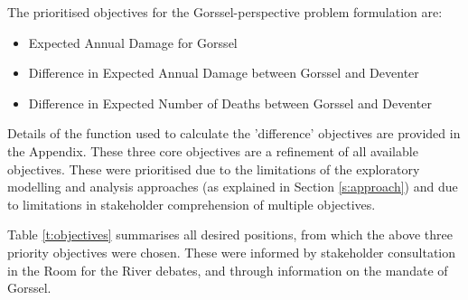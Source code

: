The prioritised objectives for the Gorssel-perspective problem formulation are:
\begin{itemize}
    \item Expected Annual Damage for Gorssel
    \item Difference in Expected Annual Damage between Gorssel and Deventer
    \item Difference in Expected Number of Deaths between Gorssel and Deventer
\end{itemize}
Details of the function used to calculate the 'difference' objectives are provided in the Appendix. These three core objectives are a refinement of all available objectives. These were prioritised due to the limitations of the exploratory modelling and analysis approaches (as explained in Section \ref{s:approach}) and due to limitations in stakeholder comprehension of multiple objectives.

Table \ref{t:objectives} summarises all desired positions, from which the above three priority objectives were chosen. These were informed by stakeholder consultation in the Room for the River debates, and through information on the mandate of Gorssel.

